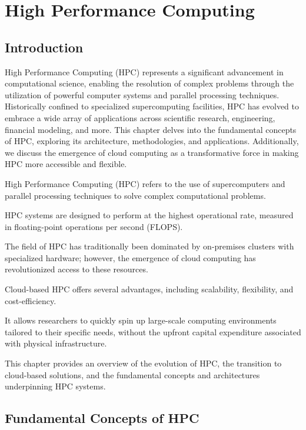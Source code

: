 

\chapter{High Performance Computing}

\section{Introduction}

High Performance Computing (HPC) represents a significant advancement in computational science, enabling the resolution of complex problems through the utilization of powerful computer systems and parallel processing techniques. Historically confined to specialized supercomputing facilities, HPC has evolved to embrace a wide array of applications across scientific research, engineering, financial modeling, and more. This chapter delves into the fundamental concepts of HPC, exploring its architecture, methodologies, and applications. Additionally, we discuss the emergence of cloud computing as a transformative force in making HPC more accessible and flexible.

High Performance Computing (HPC) refers to the use of supercomputers and parallel processing techniques to solve complex computational problems. 

HPC systems are designed to perform at the highest operational rate, measured in floating-point operations per second (FLOPS). 

The field of HPC has traditionally been dominated by on-premises clusters with specialized hardware; however, the emergence of cloud computing has revolutionized access to these resources.

Cloud-based HPC offers several advantages, including scalability, flexibility, and cost-efficiency.

It allows researchers to quickly spin up large-scale computing environments tailored to their specific needs, without the upfront capital expenditure associated with physical infrastructure. 

This chapter provides an overview of the evolution of HPC, the transition to cloud-based solutions, and the fundamental concepts and architectures underpinning HPC systems.

\section{Fundamental Concepts of HPC}


